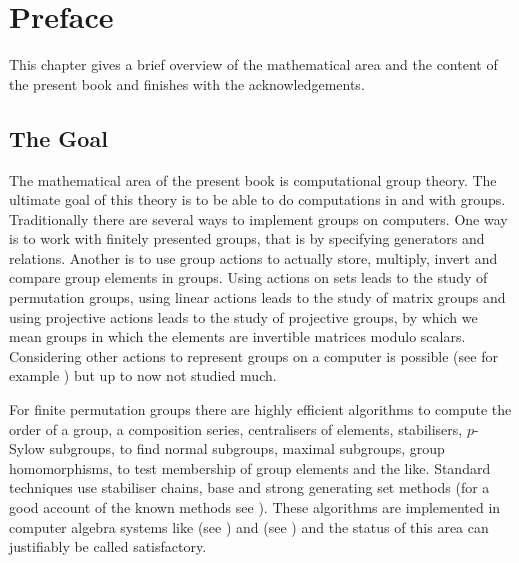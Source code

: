 
\chapter*{Preface}

\renewcommand{\thechapter}{0}

This chapter gives a brief overview of the mathematical area and the 
content of the present book and finishes with the acknowledgements.

\section{The Goal}

The mathematical area of the present book is computational group
theory. The ultimate goal of this theory is to be able to do
computations in and with groups. Traditionally there are several ways
to implement groups on computers. One way is to work with finitely
presented groups, that is by specifying generators and relations.
Another is to use group actions to actually store,
multiply, invert and compare group elements in groups. Using 
actions on sets leads to the study of permutation groups, using linear
actions leads to the study of matrix groups and using projective
actions leads to the study of projective groups, by which we mean
groups in which the elements are invertible matrices modulo scalars.
Considering other actions to represent groups on a computer is
possible (see for example \cite{Kohl}) but up to now not studied much.

For finite permutation groups there are highly efficient
algorithms to compute the order of a group, a composition series,
centralisers of elements, stabilisers, $p$-Sylow subgroups, to find
normal subgroups, maximal subgroups, group homomorphisms, to test
membership of group elements and the like.
Standard techniques use stabiliser chains, base and strong generating
set methods (for a good account of the known methods see \cite{Ser}). 
These algorithms are implemented in computer algebra
systems like {\GAP} (see \cite{GAP4}) and {\MAGMA} (see \cite{Magma})
and the status of this area can justifiably be called satisfactory.


